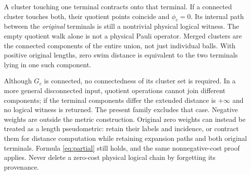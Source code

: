 \documentclass[11pt]{article}
\theoremstyle{definition}
\theoremstyle{plain}
\theoremstyle{remark}
\begin{document}
A cluster touching one terminal contracts onto that terminal.
If a connected cluster touches both, their quotient points coincide
and $\phi_c=0$. Its internal path between the \emph{original} terminals
is still a nontrivial physical logical witness. The empty quotient
walk alone is not a physical Pauli operator. Merged clusters are
the connected components of the entire union, not just individual
balls. With positive original lengths, zero swim distance is
equivalent to the two terminals lying in one such component.

Although $G_c$ is connected, no connectedness of its cluster set is
required. In a more general disconnected input, quotient operations
cannot join different components; if the terminal components differ
the extended distance is $+\infty$ and no logical witness is returned.
The present family excludes that case. Negative weights are outside
the metric construction. Original zero weights can instead be
treated as a length pseudometric: retain their labels and incidence,
or contract them for distance computation while retaining expansion
paths and both original terminals. Formula \eqref{eq:partial} still
holds, and the same nonnegative-cost proof applies. Never delete a
zero-cost physical logical chain by forgetting its provenance.
\end{document}
